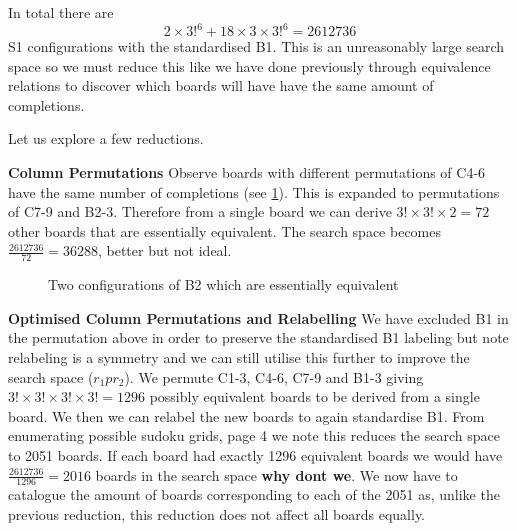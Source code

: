 \documentclass[a4paper,11pt]{report}
\newcounter{row}
\newcounter{col}
\newcounter{rowb}
\newcounter{colb}
\newcommand\setrowb[3]{
  \setcounter{colb}{1}
  \foreach \n in {#1, #2, #3} {
    \edef\x{\value{colb} - 0.5}
    \edef\y{3.5 - \value{rowb}}
    \node[anchor=center] at (\x, \y) {\n};
    \stepcounter{colb}
  }
  \stepcounter{rowb}
}
\begin{document}
{In total there are
\begin{equation}2\times3!^6+18\times 3\times 3!^6 = 2612736\end{equation}
S1 configurations with the standardised B1. This is an unreasonably large search space so we must reduce this like we have done previously through equivalence relations to discover which boards will have have the same amount of completions. 

Let us explore a few reductions.

\textbf{Column Permutations}
Observe boards with different permutations of C4-6 have the same number of completions (see \ref{fig:equiv99}). This is expanded to permutations of C7-9 and B2-3. Therefore from a single board we can derive $3!\times3!\times2=72$ other boards that are essentially equivalent. The search space becomes $\frac{2612736}{72}=36288$, better but not ideal.

\begin{figure}[h!]
\centering
{}
\caption{\label{fig:equiv99}Two configurations of B2 which are essentially equivalent}
\end{figure}

\textbf{Optimised Column Permutations and Relabelling}
We have excluded B1 in the permutation above in order to preserve the standardised B1 labeling but note relabeling is a symmetry and we can still utilise this further to improve the search space ($r_1pr_2$). We permute C1-3, C4-6, C7-9 and B1-3 giving $3!\times 3!\times 3! \times 3!=1296$ possibly equivalent boards to be derived from a single board. We then we can relabel the new boards to again standardise B1. From \cite{}enumerating possible sudoku grids, page 4 we note this reduces the search space to 2051 boards. If each board had exactly 1296 equivalent boards we would have $\frac{2612736}{1296}= 2016$ boards in the search space \textbf{why dont we}.  We now have to catalogue the amount of boards corresponding to each of the 2051 as, unlike the previous reduction, this reduction does not affect all boards equally.

}
\end{document}
